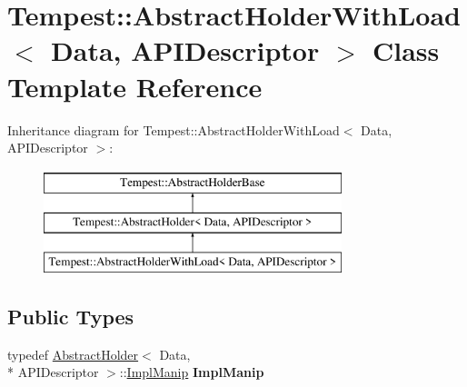 \hypertarget{class_tempest_1_1_abstract_holder_with_load}{\section{Tempest\+:\+:Abstract\+Holder\+With\+Load$<$ Data, A\+P\+I\+Descriptor $>$ Class Template Reference}
\label{class_tempest_1_1_abstract_holder_with_load}
}
Inheritance diagram for Tempest\+:\+:Abstract\+Holder\+With\+Load$<$ Data, A\+P\+I\+Descriptor $>$\+:\begin{figure}[H]
\begin{center}
\leavevmode
\includegraphics[height=3.000000cm]{class_tempest_1_1_abstract_holder_with_load}
\end{center}
\end{figure}
\subsection*{Public Types}
\begin{DoxyCompactItemize}
\item 
\hypertarget{class_tempest_1_1_abstract_holder_with_load_aab5a7dc94f9cdf1c8b1b2c9c4de1b116}{typedef \hyperlink{class_tempest_1_1_abstract_holder}{Abstract\+Holder}$<$ Data, \\*
A\+P\+I\+Descriptor $>$\+::\hyperlink{struct_tempest_1_1_abstract_holder_1_1_impl_manip}{Impl\+Manip} {\bfseries Impl\+Manip}}\label{class_tempest_1_1_abstract_holder_with_load_aab5a7dc94f9cdf1c8b1b2c9c4de1b116}

\end{DoxyCompactItemize}
